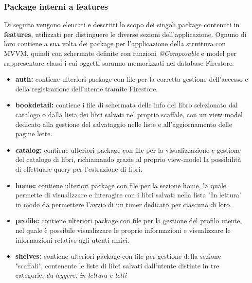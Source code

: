 \documentclass{article}
\begin{document}
\subsubsection{Package interni a features}
Di seguito vengono elencati e descritti lo scopo dei singoli package contenuti in \textbf{features}, 
utilizzati per distinguere le diverse sezioni dell'applicazione. Ognuno di loro contiene a sua volta dei package per l'applicazione della struttura con MVVM, quindi con schermate definite con funzioni \textit{@Composable} e model per rappresentare classi i cui oggetti saranno memorizzati nel database Firestore.
\begin{itemize}
  \item \textbf{auth:} contiene ulteriori package con file per la corretta gestione dell'accesso e della registrazione dell'utente tramite Firestore.
  \item \textbf{bookdetail:} contiene i file di schermata delle info del libro selezionato dal catalogo o dalla lista dei libri salvati nel proprio scaffale, con un view model dedicato alla gestione del salvataggio nelle liste e all'aggiornamento delle pagine lette.
  \item \textbf{catalog:} contiene ulteriori package con file per la visualizzazione e gestione del catalogo di libri, richiamando grazie al proprio view-model la possibilità di effettuare query per l'estrazione di libri.
  \item \textbf{home:} contiene ulteriori package con file per la sezione home, la quale permette di visualizzare e interagire con i libri salvati nella lista "In lettura" in modo da permettere l'avvio di un timer dedicato per ciascuno di loro.
  \item \textbf{profile:} contiene ulteriori package con file per la gestione del profilo utente, nel quale è possibile visualizzare le proprie informazioni e visualizzare le informazioni relative agli utenti amici.
  \item \textbf{shelves:} contiene ulteriori package con file per gestione della sezione "scaffali", contenente le liste di libri salvati dall'utente distinte in tre categorie: \textit{da leggere, in lettura e letti}
\end{itemize} 
\end{document}
